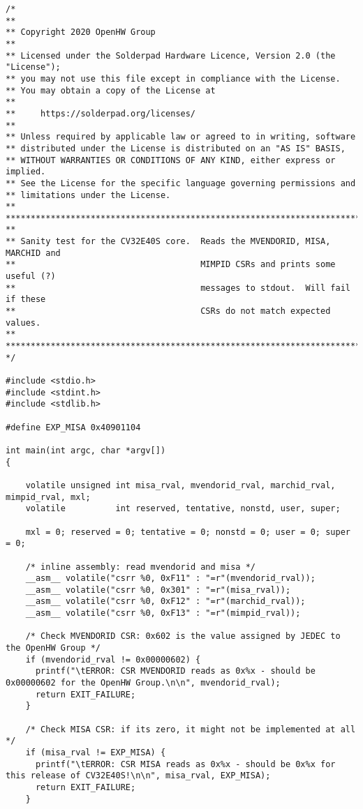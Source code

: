 \begin{lstlisting}[caption={Sanity test for the CV32E40S core.}, label=lst:sample_code]
    /*
**
** Copyright 2020 OpenHW Group
**
** Licensed under the Solderpad Hardware Licence, Version 2.0 (the "License");
** you may not use this file except in compliance with the License.
** You may obtain a copy of the License at
**
**     https://solderpad.org/licenses/
**
** Unless required by applicable law or agreed to in writing, software
** distributed under the License is distributed on an "AS IS" BASIS,
** WITHOUT WARRANTIES OR CONDITIONS OF ANY KIND, either express or implied.
** See the License for the specific language governing permissions and
** limitations under the License.
**
*******************************************************************************
**
** Sanity test for the CV32E40S core.  Reads the MVENDORID, MISA, MARCHID and
**                                     MIMPID CSRs and prints some useful (?)
**                                     messages to stdout.  Will fail if these
**                                     CSRs do not match expected values.
**
*******************************************************************************
*/

#include <stdio.h>
#include <stdint.h>
#include <stdlib.h>

#define EXP_MISA 0x40901104

int main(int argc, char *argv[])
{

    volatile unsigned int misa_rval, mvendorid_rval, marchid_rval, mimpid_rval, mxl;
    volatile          int reserved, tentative, nonstd, user, super;

    mxl = 0; reserved = 0; tentative = 0; nonstd = 0; user = 0; super = 0;

    /* inline assembly: read mvendorid and misa */
    __asm__ volatile("csrr %0, 0xF11" : "=r"(mvendorid_rval));
    __asm__ volatile("csrr %0, 0x301" : "=r"(misa_rval));
    __asm__ volatile("csrr %0, 0xF12" : "=r"(marchid_rval));
    __asm__ volatile("csrr %0, 0xF13" : "=r"(mimpid_rval));

    /* Check MVENDORID CSR: 0x602 is the value assigned by JEDEC to the OpenHW Group */
    if (mvendorid_rval != 0x00000602) {
      printf("\tERROR: CSR MVENDORID reads as 0x%x - should be 0x00000602 for the OpenHW Group.\n\n", mvendorid_rval);
      return EXIT_FAILURE;
    }

    /* Check MISA CSR: if its zero, it might not be implemented at all */
    if (misa_rval != EXP_MISA) {
      printf("\tERROR: CSR MISA reads as 0x%x - should be 0x%x for this release of CV32E40S!\n\n", misa_rval, EXP_MISA);
      return EXIT_FAILURE;
    }


\end{lstlisting}
